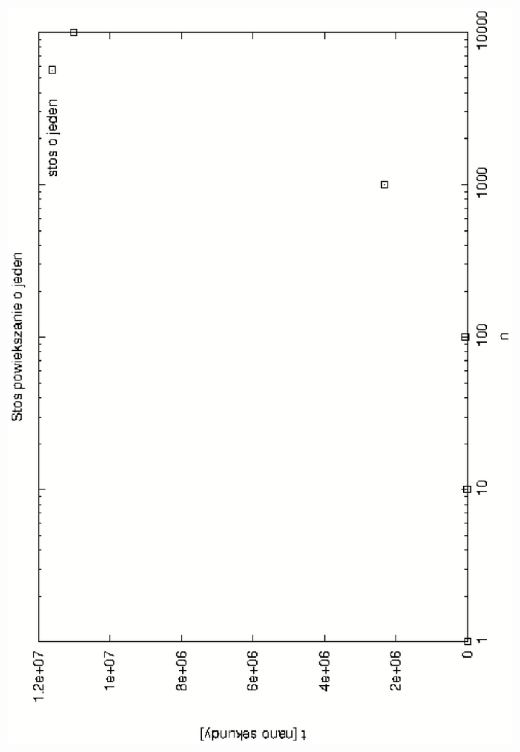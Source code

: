 \documentclass[a4paper,11pt]{report}
\begin{document}
    \includegraphics[scale=0.5, angle=270]{wykresy/stos_o_jeden.eps}
\end{document}
